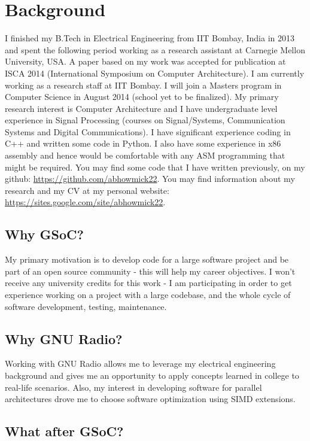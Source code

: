 \documentclass[a4paper,12pt,oneside]{article}
\begin{document}
\section{Background}
I finished my B.Tech in Electrical Engineering from IIT Bombay, India in 2013 and spent the following period working as a research assistant at Carnegie Mellon University, USA. A paper based on my work was accepted for publication at ISCA 2014 (International Symposium on Computer Architecture). I am currently working as a research staff at IIT Bombay. I will join a Masters program in Computer Science in August 2014 (school yet to be finalized). My primary research interest is Computer Architecture and I have undergraduate level experience in Signal Processing (courses on Signal/Systems, Communication Systems and Digital Communications). I have significant experience coding in C++ and written some code in Python. I also have some experience in x86 assembly and hence would be comfortable with any ASM programming that might be required. You may find some code that I have written previously, on my github: \url{https://github.com/abhowmick22}. You may find information about my research and my CV at my personal website: \url{https://sites.google.com/site/abhowmick22}.  

\subsection{Why GSoC?}

My primary motivation is to develop code for a large software project and be part of an open source community - this will help my career objectives. I won't receive any university credits for this work - I am participating in order to get experience working on a project with a large codebase, and the whole cycle of software development, testing, maintenance. 

\subsection{Why GNU Radio?}

Working with GNU Radio allows me to leverage my electrical engineering background and gives me an opportunity to apply concepts learned in college to real-life scenarios. Also, my interest in developing software for parallel architectures drove me to choose software optimization using SIMD extensions.

\subsection{What after GSoC?}
\end{document}
